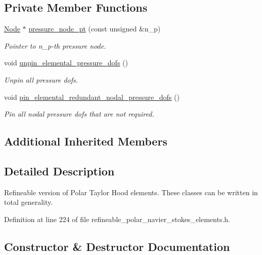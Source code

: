 \subsection*{Private Member Functions}
\begin{DoxyCompactItemize}
\item 
\hyperlink{classoomph_1_1Node}{Node} $\ast$ \hyperlink{classoomph_1_1RefineablePolarTaylorHoodElement_a327a296af13c5c7346fdfd06b4da7bd8}{pressure\+\_\+node\+\_\+pt} (const unsigned \&n\+\_\+p)
\begin{DoxyCompactList}\small\item\em Pointer to n\+\_\+p-\/th pressure node. \end{DoxyCompactList}\item 
void \hyperlink{classoomph_1_1RefineablePolarTaylorHoodElement_a08d48de7b56b5412b8e7c5269381b18d}{unpin\+\_\+elemental\+\_\+pressure\+\_\+dofs} ()
\begin{DoxyCompactList}\small\item\em Unpin all pressure dofs. \end{DoxyCompactList}\item 
void \hyperlink{classoomph_1_1RefineablePolarTaylorHoodElement_a6c4de6358f04635ecd54ef87487d7ada}{pin\+\_\+elemental\+\_\+redundant\+\_\+nodal\+\_\+pressure\+\_\+dofs} ()
\begin{DoxyCompactList}\small\item\em Pin all nodal pressure dofs that are not required. \end{DoxyCompactList}\end{DoxyCompactItemize}
\subsection*{Additional Inherited Members}


\subsection{Detailed Description}
Refineable version of Polar Taylor Hood elements. These classes can be written in total generality. 

Definition at line 224 of file refineable\+\_\+polar\+\_\+navier\+\_\+stokes\+\_\+elements.\+h.



\subsection{Constructor \& Destructor Documentation}
\mbox{\label{classoomph_1_1RefineablePolarTaylorHoodElement_aa9ed1c76464ca63fe5afaf5bea1d2fd2}} 
